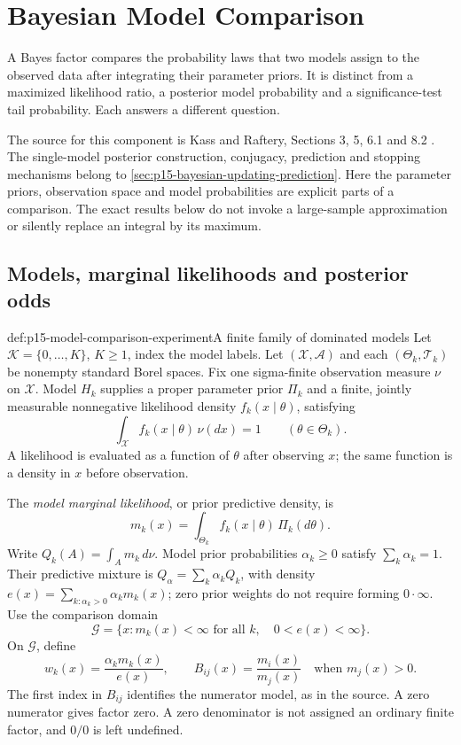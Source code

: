 \chapter{Bayesian Model Comparison}
\label{sec:p15-bayesian-model-comparison}

A Bayes factor compares the probability laws that two models assign to the
observed data after integrating their parameter priors. It is distinct from
a maximized likelihood ratio, a posterior model probability and a
significance-test tail probability. Each answers a different question.

The source for this component is Kass and Raftery, Sections 3, 5, 6.1 and
8.2 \cite[pp.~776--777, 781--784, 789--790]{KassRaftery1995BayesFactors}.
The single-model posterior construction, conjugacy, prediction and stopping
mechanisms belong to \cref{sec:p15-bayesian-updating-prediction}.
Here the parameter priors, observation space and model probabilities are
explicit parts of a comparison. The exact results below do not invoke a
large-sample approximation or silently replace an integral by its maximum.

\section{Models, marginal likelihoods and posterior odds}
\label{sec:p15-model-likelihoods}

\begin{hbdefinition}{def:p15-model-comparison-experiment}{A finite family of dominated models}
Let \(\mathcal K=\{0,\ldots,K\}\), \(K\geq1\), index the model labels.
Let \((\mathcal X,\mathcal A)\) and each \((\Theta_k,\mathcal T_k)\) be
nonempty standard Borel spaces. Fix one sigma-finite observation measure
\(\nu\) on \(\mathcal X\). Model \(H_k\) supplies a proper parameter
prior \(\Pi_k\) and a finite, jointly measurable nonnegative likelihood density
\(f_k(x\mid\theta)\), satisfying
\[
 \int_{\mathcal X}f_k(x\mid\theta)\,\nu(dx)=1
 \qquad(\theta\in\Theta_k).
\]
A likelihood is evaluated as a function of \(\theta\) after observing \(x\);
the same function is a density in \(x\) before observation.

The \emph{model marginal likelihood}, or prior predictive density, is
\[
 m_k(x)=\int_{\Theta_k}f_k(x\mid\theta)\,\Pi_k(d\theta).
\]
Write \(Q_k(A)=\int_A m_k\,d\nu\). Model prior probabilities
\(\alpha_k\geq0\) satisfy \(\sum_k\alpha_k=1\). Their predictive mixture
is \(Q_\alpha=\sum_k\alpha_kQ_k\), with density
\(e(x)=\sum_{k:\alpha_k>0}\alpha_km_k(x)\); zero prior weights do not
require forming \(0\cdot\infty\).
Use the comparison domain
\[
 \mathcal G=\{x:m_k(x)<\infty\text{ for all }k,\quad 0<e(x)<\infty\}.
\]
On \(\mathcal G\), define
\[
 w_k(x)=\frac{\alpha_km_k(x)}{e(x)},\qquad
 B_{ij}(x)=\frac{m_i(x)}{m_j(x)}\quad\text{when }m_j(x)>0.
\]
The first index in \(B_{ij}\) identifies the numerator model, as in the
source. A zero numerator gives factor zero. A zero denominator is not
assigned an ordinary finite factor, and \(0/0\) is left undefined.
\end{hbdefinition}

